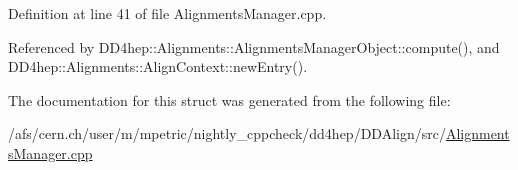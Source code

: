 Definition at line 41 of file Alignments\+Manager.\+cpp.



Referenced by D\+D4hep\+::\+Alignments\+::\+Alignments\+Manager\+Object\+::compute(), and D\+D4hep\+::\+Alignments\+::\+Align\+Context\+::new\+Entry().



The documentation for this struct was generated from the following file\+:\begin{DoxyCompactItemize}
\item 
/afs/cern.\+ch/user/m/mpetric/nightly\+\_\+cppcheck/dd4hep/\+D\+D\+Align/src/\hyperlink{_alignments_manager_8cpp}{Alignments\+Manager.\+cpp}\end{DoxyCompactItemize}
